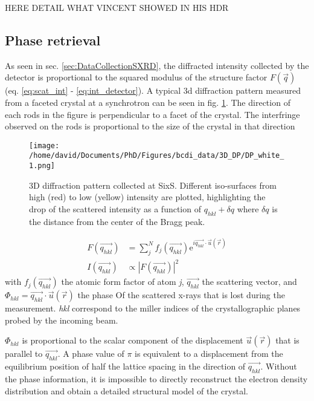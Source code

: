HERE DETAIL WHAT VINCENT SHOWED IN HIS HDR


\subsection{Phase retrieval}

As seen in sec. \ref{sec:DataCollectionSXRD}, the diffracted intensity collected by the detector is proportional to the squared modulus of the structure factor $F(\vec{q})$ (eq. \ref{eq:scat_int} - \ref{eq:int_detector}).
A typical 3d diffraction pattern measured from a faceted crystal at a synchrotron can be seen in fig. \ref{fig:3DDP}.
The direction of each rods in the figure is perpendicular to a facet of the crystal.
The interfringe observed on the rods is proportional to the size of the crystal in that direction

\begin{figure}[!htb]
    \centering
    \texttt{[image: /home/david/Documents/PhD/Figures/bcdi\_data/3D\_DP/DP\_white\_1.png]}
    \caption{
    3D diffraction pattern collected at SixS.
    Different iso-surfaces from high (red) to low (yellow) intensity are plotted, highlighting the drop of the scattered intensity as a function of $q_{hkl}+\delta q$ where $\delta q$ is the distance from the center of the Bragg peak.
    }
    \label{fig:3DDP}
\end{figure}

\begin{align}
    \label{eq:scat_int}
    F(\vec{q_{hkl}}) & = \sum_j^N f_j (\vec{q_{hkl}}) \mathrm{e}^{i\vec{q_{hkl}}\cdot\vec{u}(\vec{r})} \\
    \label{eq:int_detector}
    I(\vec{q_{hkl}}) & \propto |F(\vec{q_{hkl}})|^2
\end{align}
with $f_j (\vec{q_{hkl}})$ the atomic form factor of atom \textit{j}, $\vec{q_{hkl}}$ the scattering vector, and $\Phi_{hkl} = \vec{q_{hkl}}\cdot\vec{u}(\vec{r})$ the phase Of the scattered x-rays that is lost during the measurement.
\textit{hkl} correspond to the miller indices of the crystallographic planes probed by the incoming beam.

$\Phi_{hkl}$ is proportional to the scalar component of the displacement $\vec{u}(\vec{r})$ that is parallel to $ \vec{q_{hkl}}$.
A phase value of $\pi$ is equivalent to a displacement from the equilibrium position of half the lattice spacing in the direction of $\vec{q_{hkl}}$.
Without the phase information, it is impossible to directly reconstruct the electron density distribution and obtain a detailed structural model of the crystal.

